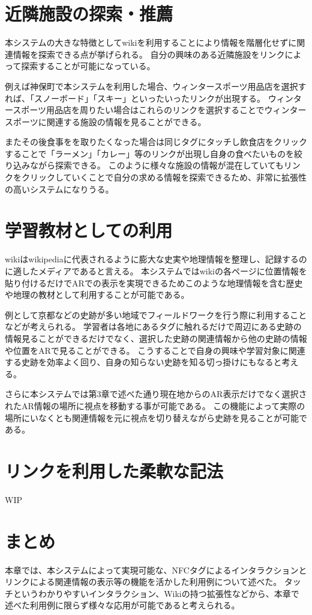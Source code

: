 \section{近隣施設の探索・推薦}
本システムの大きな特徴としてwikiを利用することにより情報を階層化せずに関連情報を探索できる点が挙げられる。
自分の興味のある近隣施設をリンクによって探索することが可能になっている。

例えば神保町で本システムを利用した場合、ウィンタースポーツ用品店を選択すれば、「スノーボード」「スキー」といったいったリンクが出現する。
ウィンタースポーツ用品店を周りたい場合はこれらのリンクを選択することでウィンタースポーツに関連する施設の情報を見ることができる。

またその後食事をを取りたくなった場合は同じタグにタッチし飲食店をクリックすることで「ラーメン」「カレー」等のリンクが出現し自身の食べたいものを絞り込みながら探索できる。
このように様々な施設の情報が混在していてもリンクをクリックしていくことで自分の求める情報を探索できるため、非常に拡張性の高いシステムになりうる。


\section{学習教材としての利用}
wikiはwikipediaに代表されるように膨大な史実や地理情報を整理し、記録するのに適したメディアであると言える。
本システムではwikiの各ページに位置情報を貼り付けるだけでARでの表示を実現できるためこのような地理情報を含む歴史や地理の教材として利用することが可能である。

例として京都などの史跡が多い地域でフィールドワークを行う際に利用することなどが考えられる。
学習者は各地にあるタグに触れるだけで周辺にある史跡の情報見ることができるだけでなく、選択した史跡の関連情報から他の史跡の情報や位置をARで見ることができる。
こうすることで自身の興味や学習対象に関連する史跡を効率よく回り、自身の知らない史跡を知る切っ掛けにもなると考える。

さらに本システムでは第3章で述べた通り現在地からのAR表示だけでなく選択されたAR情報の場所に視点を移動する事が可能である。
この機能によって実際の場所にいなくとも関連情報を元に視点を切り替えながら史跡を見ることが可能である。

\section{リンクを利用した柔軟な記法}
WIP


\section{まとめ}
本章では、本システムによって実現可能な、NFCタグによるインタラクションとリンクによる関連情報の表示等の機能を活かした利用例について述べた。
タッチというわかりやすいインタラクション、Wikiの持つ拡張性などから、本章で述べた利用例に限らず様々な応用が可能であると考えられる。